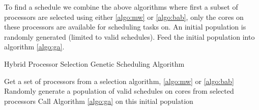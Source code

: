\documentclass[conference]{IEEEtran}
\begin{document}
To find a schedule we combine the above algorithms where first a subset of processors are selected using either \ref{algo:mw} or \ref{algo:bab}, only the cores on these processors are available for scheduling tasks on. An initial population is randomly generated (limited to valid schedules). Feed the initial population into algorithm \ref{algo:ga}.

\begin{algorithm} 
\caption{Hybrid Processor Selection Genetic Scheduling Algorithm} \label{algo:hypsgsa}
\footnotesize
\begin{algorithmic}[1] 
\STATE Get a set of processors from a selection algorithm, \ref{algo:mw} or \ref{algo:bab}
\STATE Randomly generate a population of valid schedules on cores from selected processors
\STATE Call Algorithm \ref{algo:ga} on this initial population
\end{algorithmic}
\end{algorithm}
\vspace{-0.2in}






%
\end{document}
